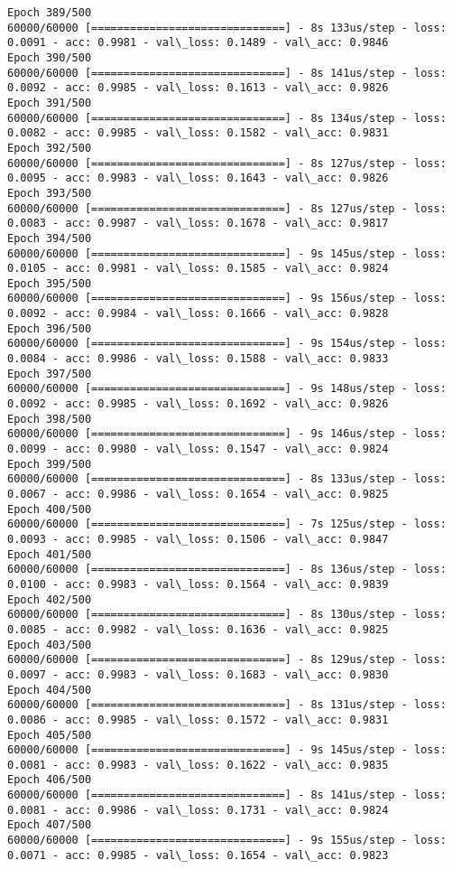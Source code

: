 \documentclass[11pt]{article}
\begin{document}
\begin{Verbatim}[commandchars=\\\{\}]
Epoch 389/500
60000/60000 [==============================] - 8s 133us/step - loss: 0.0091 - acc: 0.9981 - val\_loss: 0.1489 - val\_acc: 0.9846
Epoch 390/500
60000/60000 [==============================] - 8s 141us/step - loss: 0.0092 - acc: 0.9985 - val\_loss: 0.1613 - val\_acc: 0.9826
Epoch 391/500
60000/60000 [==============================] - 8s 134us/step - loss: 0.0082 - acc: 0.9985 - val\_loss: 0.1582 - val\_acc: 0.9831
Epoch 392/500
60000/60000 [==============================] - 8s 127us/step - loss: 0.0095 - acc: 0.9983 - val\_loss: 0.1643 - val\_acc: 0.9826
Epoch 393/500
60000/60000 [==============================] - 8s 127us/step - loss: 0.0083 - acc: 0.9987 - val\_loss: 0.1678 - val\_acc: 0.9817
Epoch 394/500
60000/60000 [==============================] - 9s 145us/step - loss: 0.0105 - acc: 0.9981 - val\_loss: 0.1585 - val\_acc: 0.9824
Epoch 395/500
60000/60000 [==============================] - 9s 156us/step - loss: 0.0092 - acc: 0.9984 - val\_loss: 0.1666 - val\_acc: 0.9828
Epoch 396/500
60000/60000 [==============================] - 9s 154us/step - loss: 0.0084 - acc: 0.9986 - val\_loss: 0.1588 - val\_acc: 0.9833
Epoch 397/500
60000/60000 [==============================] - 9s 148us/step - loss: 0.0092 - acc: 0.9985 - val\_loss: 0.1692 - val\_acc: 0.9826
Epoch 398/500
60000/60000 [==============================] - 9s 146us/step - loss: 0.0099 - acc: 0.9980 - val\_loss: 0.1547 - val\_acc: 0.9824
Epoch 399/500
60000/60000 [==============================] - 8s 133us/step - loss: 0.0067 - acc: 0.9986 - val\_loss: 0.1654 - val\_acc: 0.9825
Epoch 400/500
60000/60000 [==============================] - 7s 125us/step - loss: 0.0093 - acc: 0.9985 - val\_loss: 0.1506 - val\_acc: 0.9847
Epoch 401/500
60000/60000 [==============================] - 8s 136us/step - loss: 0.0100 - acc: 0.9983 - val\_loss: 0.1564 - val\_acc: 0.9839
Epoch 402/500
60000/60000 [==============================] - 8s 130us/step - loss: 0.0085 - acc: 0.9982 - val\_loss: 0.1636 - val\_acc: 0.9825
Epoch 403/500
60000/60000 [==============================] - 8s 129us/step - loss: 0.0097 - acc: 0.9983 - val\_loss: 0.1683 - val\_acc: 0.9830
Epoch 404/500
60000/60000 [==============================] - 8s 131us/step - loss: 0.0086 - acc: 0.9985 - val\_loss: 0.1572 - val\_acc: 0.9831
Epoch 405/500
60000/60000 [==============================] - 9s 145us/step - loss: 0.0081 - acc: 0.9983 - val\_loss: 0.1622 - val\_acc: 0.9835
Epoch 406/500
60000/60000 [==============================] - 8s 141us/step - loss: 0.0081 - acc: 0.9986 - val\_loss: 0.1731 - val\_acc: 0.9824
Epoch 407/500
60000/60000 [==============================] - 9s 155us/step - loss: 0.0071 - acc: 0.9985 - val\_loss: 0.1654 - val\_acc: 0.9823

\end{Verbatim}
\end{document}
